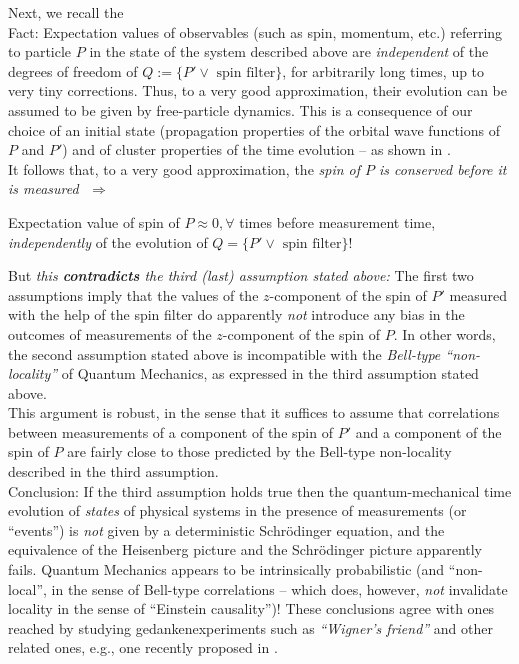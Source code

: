 \documentclass[12pt]{article}
\begin{document}
Next, we recall the\\
{Fact:}
Expectation values of observables (such as spin, momentum, etc.) referring to particle $P$ in the state of the system described above are \textit{independent} of the degrees of freedom of 
$Q:= \lbrace P'\vee \text{ spin filter}\rbrace$, for arbitrarily long times, up to very tiny corrections. Thus, to a very good approximation, their evolution can be assumed to be given by free-particle dynamics. This is a consequence of our choice of an initial state (propagation properties of the orbital wave functions of $P$ and $P'$) and of cluster properties of the time evolution -- as shown in \cite{FFS}. \\
It follows that, to a very good approximation, the \textit{spin of $P$ is \textit{conserved} before it is measured} \,\,$\Rightarrow$
\begin{center}
{Expectation value of spin of $P \approx 0, \forall$ times before measurement time,}
{\textit{independently} of the evolution of $Q= \lbrace P' \vee \text{  spin filter}\rbrace$!}
\end{center}

But \textit{this {\bf{contradicts}} the third (last) assumption stated above:} The first two assumptions imply that the values of the $z$-component of the spin of $P'$ measured with the help of the spin filter do apparently \textit{not} introduce any bias in the outcomes of measurements of the $z$-component of the spin of $P$. In other words, the second assumption stated above is incompatible with the \textit{Bell-type ``non-locality''} of Quantum Mechanics, as expressed in the third assumption stated above. \\
This argument is robust, in the sense that it suffices to assume that correlations between measurements of a component of the spin of $P'$ and a component of the spin of $P$ are fairly close to those predicted by the Bell-type non-locality described in the third assumption.\\

{Conclusion:} If the third assumption holds true then the quantum-mechanical time evolution of \textit{states} of physical systems in the presence of measurements (or ``events'') is \textit{not} given by a deterministic Schr\"{o}dinger equation, and the equivalence of the Heisenberg picture and the Schr\"{o}dinger picture apparently fails. Quantum Mechanics appears to be intrinsically probabilistic (and ``non-local'', in the sense of Bell-type correlations -- which does, however, \textit{not} invalidate locality in the sense of ``Einstein causality'')!
These conclusions agree with ones reached by studying gedankenexperiments such as \textit{``Wigner's friend''} and other related ones, e.g., one recently proposed in \cite{Renner}.\\
\end{document}
